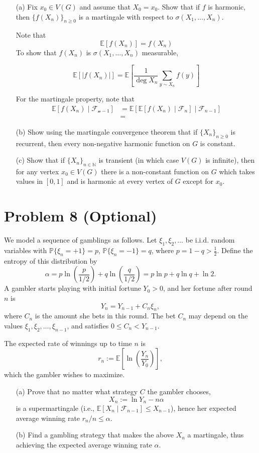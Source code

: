 \documentclass[11pt]{article}
\newcommand{\bbE}{\mathbb{E}}
\begin{document}
\begin{itemize}
    \item[(a)] Fix \(x_0 \in V(G)\) and assume that \(X_0 = x_0\). Show that if \(f\) is harmonic, then \(\{f(X_n)\}_{n \geq 0}\) is a martingale with respect to \(\sigma(X_1, \ldots, X_n)\).
\begin{solution}
Note that 
\[\bbE[f(X_n)] = f(X_n)\]
    To show that $f(X_n)$ is $\sigma(X_1, \dots, X_n)$ measurable, 

    \[\bbE[|f(X_n)|] = \bbE[\frac{1}{\deg X_n} \sum_{y\sim X_n}f(y)]\]

    For the martingale property, note that 
    \begin{align*}
        \bbE[f(X_n) \mid \mathcal{F_{n-1}}]
        &= \bbE[\bbE[f(X_n) \mid \mathcal{F}_n] \mid \mathcal{F}_{n-1}]\\
        &= 
    \end{align*}
\end{solution}
    \item[(b)] Show using the martingale convergence theorem that if \(\{X_n\}_{n \geq 0}\) is recurrent, then every non-negative harmonic function on \(G\) is constant.
    \item[(c)] Show that if \(\{X_n\}_{n \in \mathbb{N}}\) is transient (in which case \(V(G)\) is infinite), then for any vertex \(x_0 \in V(G)\) there is a non-constant function on \(G\) which takes values in \([0, 1]\) and is harmonic at every vertex of \(G\) except for \(x_0\).
\end{itemize}

\newpage

\section*{Problem 8 (Optional)}
We model a sequence of gamblings as follows. Let \(\xi_1, \xi_2, \ldots\) be i.i.d. random variables with \(\mathbb{P}\{\xi_n = +1\} = p\), \(\mathbb{P}\{\xi_n = -1\} = q\), where \(p = 1 - q > \frac{1}{2}\). Define the entropy of this distribution by
\[
\alpha = p \ln\left(\frac{p}{1/2}\right) + q \ln\left(\frac{q}{1/2}\right) = p \ln p + q \ln q + \ln 2.
\]
A gambler starts playing with initial fortune \(Y_0 > 0\), and her fortune after round \(n\) is
\[
Y_n = Y_{n-1} + C_n \xi_n,
\]
where \(C_n\) is the amount she bets in this round. The bet \(C_n\) may depend on the values \(\xi_1, \xi_2, \ldots, \xi_{n-1}\), and satisfies \(0 \leq C_n < Y_{n-1}\).

The expected rate of winnings up to time \(n\) is
\[
r_n := \mathbb{E} \left[\ln\left(\frac{Y_n}{Y_0}\right)\right],
\]
which the gambler wishes to maximize.

\begin{itemize}
    \item[(a)] Prove that no matter what strategy \(C\) the gambler chooses,
    \[
    X_n := \ln Y_n - n\alpha
    \]
    is a supermartingale (i.e., \(\mathbb{E}[X_n \mid \mathcal{F}_{n-1}] \leq X_{n-1}\)), hence her expected average winning rate \(r_n / n \leq \alpha\).
    \item[(b)] Find a gambling strategy that makes the above \(X_n\) a martingale, thus achieving the expected average winning rate \(\alpha\).
\end{itemize}
\end{document}
